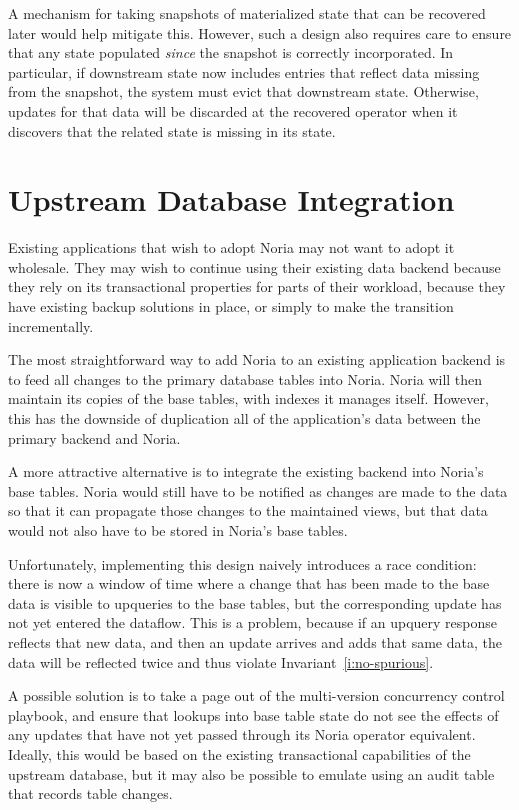 A mechanism for taking snapshots of materialized state that can be recovered
later would help mitigate this. However, such a design also requires care to
ensure that any state populated \emph{since} the snapshot is correctly
incorporated. In particular, if downstream state now includes entries that
reflect data missing from the snapshot, the system must evict that downstream
state. Otherwise, updates for that data will be discarded at the recovered
operator when it discovers that the related state is missing in its state.

\section{Upstream Database Integration}

Existing applications that wish to adopt Noria may not want to adopt it
wholesale. They may wish to continue using their existing data backend because
they rely on its transactional properties for parts of their workload, because
they have existing backup solutions in place, or simply to make the transition
incrementally.

The most straightforward way to add Noria to an existing application backend is
to feed all changes to the primary database tables into Noria. Noria will then
maintain its copies of the base tables, with indexes it manages itself. However,
this has the downside of duplication all of the application's data between the
primary backend and Noria.

A more attractive alternative is to integrate the existing backend into Noria's
base tables. Noria would still have to be notified as changes are made to the
data so that it can propagate those changes to the maintained views, but that
data would not also have to be stored in Noria's base tables.

Unfortunately, implementing this design naively introduces a race condition:
there is now a window of time where a change that has been made to the base data
is visible to upqueries to the base tables, but the corresponding update has not
yet entered the dataflow. This is a problem, because if an upquery response
reflects that new data, and then an update arrives and adds that same data, the
data will be reflected twice and thus violate Invariant~\ref{i:no-spurious}.

A possible solution is to take a page out of the multi-version concurrency
control playbook, and ensure that lookups into base table state do not see the
effects of any updates that have not yet passed through its Noria operator
equivalent. Ideally, this would be based on the existing transactional
capabilities of the upstream database, but it may also be possible to emulate
using an audit table that records table changes.


